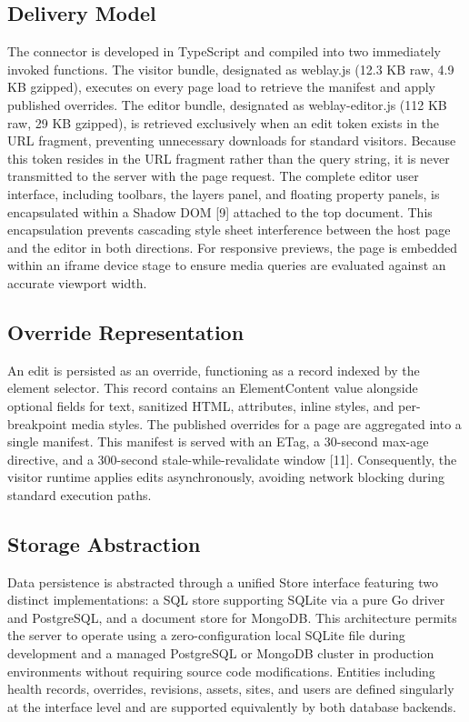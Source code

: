 \documentclass[conference]{IEEEtran}
\begin{document}
\subsection{Delivery Model}
The connector is developed in TypeScript and compiled into two immediately invoked functions. The visitor bundle, designated as weblay.js (12.3 KB raw, 4.9 KB gzipped), executes on every page load to retrieve the manifest and apply published overrides. The editor bundle, designated as weblay-editor.js (112 KB raw, 29 KB gzipped), is retrieved exclusively when an edit token exists in the URL fragment, preventing unnecessary downloads for standard visitors. Because this token resides in the URL fragment rather than the query string, it is never transmitted to the server with the page request. The complete editor user interface, including toolbars, the layers panel, and floating property panels, is encapsulated within a Shadow DOM [9] attached to the top document. This encapsulation prevents cascading style sheet interference between the host page and the editor in both directions. For responsive previews, the page is embedded within an iframe device stage to ensure media queries are evaluated against an accurate viewport width.

\subsection{Override Representation}
An edit is persisted as an override, functioning as a record indexed by the element selector. This record contains an ElementContent value alongside optional fields for text, sanitized HTML, attributes, inline styles, and per-breakpoint media styles. The published overrides for a page are aggregated into a single manifest. This manifest is served with an ETag, a 30-second max-age directive, and a 300-second stale-while-revalidate window [11]. Consequently, the visitor runtime applies edits asynchronously, avoiding network blocking during standard execution paths.

\subsection{Storage Abstraction}
Data persistence is abstracted through a unified Store interface featuring two distinct implementations: a SQL store supporting SQLite via a pure Go driver and PostgreSQL, and a document store for MongoDB. This architecture permits the server to operate using a zero-configuration local SQLite file during development and a managed PostgreSQL or MongoDB cluster in production environments without requiring source code modifications. Entities including health records, overrides, revisions, assets, sites, and users are defined singularly at the interface level and are supported equivalently by both database backends.
\end{document}
